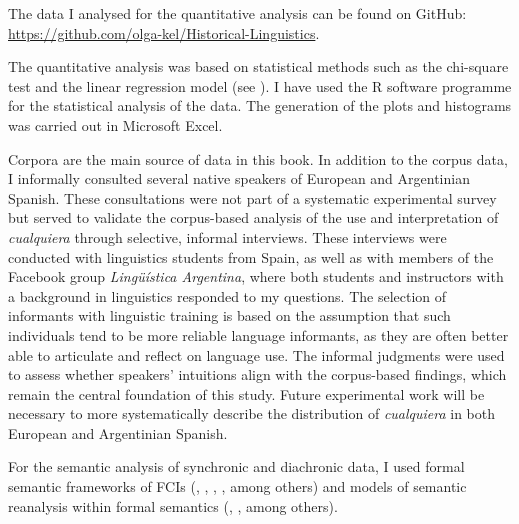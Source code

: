 The data I analysed for the quantitative analysis can be found on GitHub: \url{https://github.com/olga-kel/Historical-Linguistics}.

The quantitative analysis was based on statistical methods such as the chi-square test and the linear regression model (see \citealt{Baayen2008}). I have used the R software programme for the statistical analysis of the data. The generation of the plots and histograms was carried out in Microsoft Excel.

{Corpora are the main source of data in this book. In addition to the corpus data, I informally consulted several native speakers of European and Argentinian Spanish. These consultations were not part of a systematic experimental survey but served to validate the corpus-based analysis of the use and interpretation of \textit{cualquiera} through selective, informal interviews. These interviews were conducted with linguistics students from Spain, as well as with members of the Facebook group \textit{Lingüística Argentina}, where both students and instructors with a background in linguistics responded to my questions. The selection of informants with linguistic training is based on the assumption that such individuals tend to be more reliable language informants, as they are often better able to articulate and reflect on language use. The informal judgments were used to assess whether speakers’ intuitions align with the corpus-based findings, which remain the central foundation of this study. Future experimental work will be necessary to more systematically describe the distribution of \textit{cualquiera} in both European and Argentinian Spanish.}   

For the semantic analysis of synchronic and diachronic data, I used formal semantic frameworks of FCIs (\citealt{Chierchia2006}, \citealt{Aloni2021}, \citealt{AloniPort2013}, \citealt{Alonso-OvalleMenéndez-Benito2011,am2018}, among others) and models of semantic reanalysis within formal semantics (\citealt{Eckardt2006}, \citealt{AloniPort2013}, among others).

